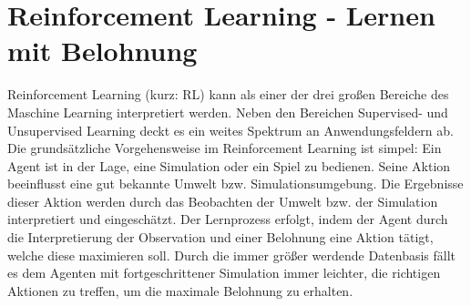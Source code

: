 
\chapter{Reinforcement Learning - Lernen mit Belohnung}
\label{chap:rl}
%

	Reinforcement Learning (kurz: RL) kann als einer der drei großen Bereiche des Maschine Learning interpretiert werden. Neben den Bereichen \glqq Supervised-\grqq{} und \glqq Unsupervised Learning\grqq{} deckt es ein weites Spektrum an Anwendungsfeldern ab.\\
	Die grundsätzliche Vorgehensweise im Reinforcement Learning ist simpel: Ein Agent ist in der Lage, eine Simulation oder ein Spiel zu bedienen. Seine Aktion beeinflusst eine gut bekannte Umwelt bzw. Simulationsumgebung. Die Ergebnisse dieser Aktion werden durch das Beobachten der Umwelt bzw. der Simulation interpretiert und eingeschätzt. Der Lernprozess erfolgt, indem der Agent durch die Interpretierung der Observation und einer Belohnung eine Aktion tätigt, welche diese maximieren soll. Durch die immer größer werdende Datenbasis fällt es dem Agenten mit fortgeschrittener Simulation immer leichter, die \glqq richtigen\grqq{} Aktionen zu treffen, um die maximale Belohnung zu erhalten.
	

